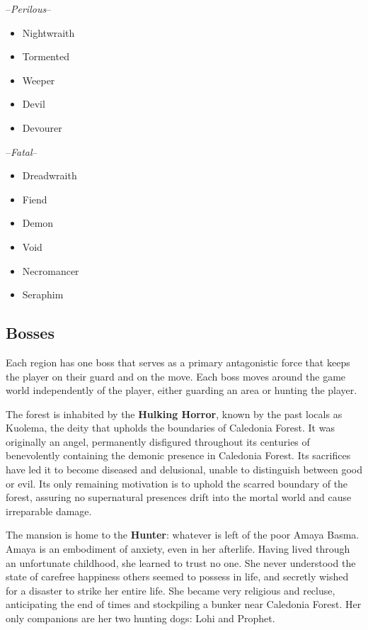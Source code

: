 \documentclass[11pt]{article}
\begin{document}
	--\textit{Perilous}--
	\begin{itemize}
		\item Nightwraith
		\item Tormented
		\item Weeper
		\item Devil
		\item Devourer
	\end{itemize}
	
	--\textit{Fatal}--
	\begin{itemize}
		\item Dreadwraith
		\item Fiend
		\item Demon
		\item Void
		\item Necromancer
		\item Seraphim
	\end{itemize}
	
	\subsection{Bosses}
	
	Each region has one boss that serves as a primary antagonistic force that keeps the player on their guard and on the move. Each boss moves around the game world independently of the player, either guarding an area or hunting the player.\newline
	
	The forest is inhabited by the \textbf{Hulking Horror}, known by the past locals as Kuolema, the deity that upholds the boundaries of Caledonia Forest. It was originally an angel, permanently disfigured throughout its centuries of benevolently containing the demonic presence in Caledonia Forest. Its sacrifices have led it to become diseased and delusional, unable to distinguish between good or evil. Its only remaining motivation is to uphold the scarred boundary of the forest, assuring no supernatural presences drift into the mortal world and cause irreparable damage.\newline
	
	The mansion is home to the \textbf{Hunter}: whatever is left of the poor Amaya Basma. Amaya is an embodiment of anxiety, even in her afterlife. Having lived through an unfortunate childhood, she learned to trust no one. She never understood the state of carefree happiness others seemed to possess in life, and secretly wished for a disaster to strike her entire life. She became very religious and recluse, anticipating the end of times and stockpiling a bunker near Caledonia Forest. Her only companions are her two hunting dogs: Lohi and Prophet.
\end{document}
